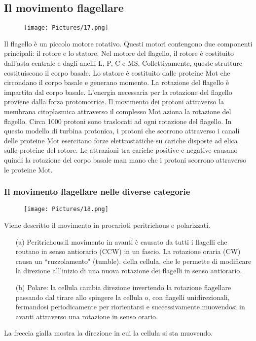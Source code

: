 \subsection{Il movimento flagellare}
\begin{wrapfigure}{l}{0.5\textwidth}
  \begin{center}
    \texttt{[image: Pictures/17.png]}
  \end{center}
\end{wrapfigure}
Il flagello è un piccolo motore rotativo. Questi motori contengono due componenti principali: il rotore e lo statore. Nel motore del flagello, il rotore è 
costituito dall'asta centrale e dagli anelli L, P, C e MS. Collettivamente, queste strutture costituiscono il corpo basale. Lo statore è costituito dalle 
proteine Mot che circondano il corpo basale e generano momento. La rotazione del flagello è impartita dal corpo basale. L'energia necessaria per la 
rotazione del flagello proviene dalla forza protomotrice. Il movimento dei protoni attraverso la membrana citoplasmica attraverso il complesso Mot aziona la 
rotazione del flagello. Circa 1000 protoni sono traslocati ad ogni rotazione del flagello. In questo modello di turbina protonica, i protoni che scorrono 
attraverso i canali delle proteine Mot esercitano forze elettrostatiche su cariche disposte ad elica sulle proteine del rotore. Le attrazioni tra cariche 
positive e negative causano quindi la rotazione del corpo basale man mano che i protoni scorrono attraverso le proteine Mot.
\subsubsection{Il movimento flagellare nelle diverse categorie}
\begin{wrapfigure}{l}{0.5\textwidth}
  \begin{center}
    \texttt{[image: Pictures/18.png]}
  \end{center}
\end{wrapfigure}
Viene descritto il movimento in procarioti peritrichous e polarizzati.
\begin{itemize}
	\item[(a)] Peritrichous:il movimento in avanti \`e causato da tutti i flagelli che routano in senso antiorario (CCW) in un fascio. La rotazione oraria (CW) causa un 
		``ruzzolamento" (tumble). della cellula, che le permette di modificare la direzione all'inizio di una nuova rotazione dei flagelli in senso antiorario. 
	\item[(b)] Polare: la cellula cambia direzione invertendo la rotazione flagellare passando dal tirare allo spingere la cellula o, con flagelli unidirezionali, fermandosi periodicamente per riorientarsi e successivamente 
		muovendosi in avanti attraverso una rotazione in senso orario. 
\end{itemize}
La freccia gialla mostra la direzione in cui la cellula si sta muovendo.
